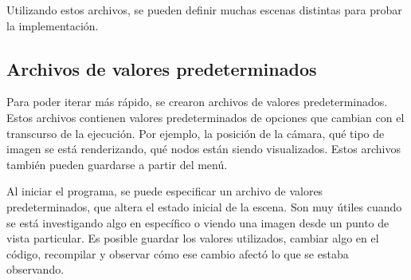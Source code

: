 Utilizando estos archivos, se pueden definir muchas escenas distintas para probar la implementación.

\subsection{Archivos de valores predeterminados}

Para poder iterar más rápido, se crearon archivos de valores predeterminados.
Estos archivos contienen valores predeterminados de opciones que cambian con el transcurso de la ejecución.
Por ejemplo, la posición de la cámara, qué tipo de imagen se está renderizando, qué nodos están siendo visualizados.
Estos archivos también pueden guardarse a partir del menú.

Al iniciar el programa, se puede especificar un archivo de valores predeterminados, que altera el estado inicial de la escena.
Son muy útiles cuando se está investigando algo en específico o viendo una imagen desde un punto de vista particular.
Es posible guardar los valores utilizados, cambiar algo en el código, recompilar y observar cómo ese cambio afectó lo que se estaba observando.
